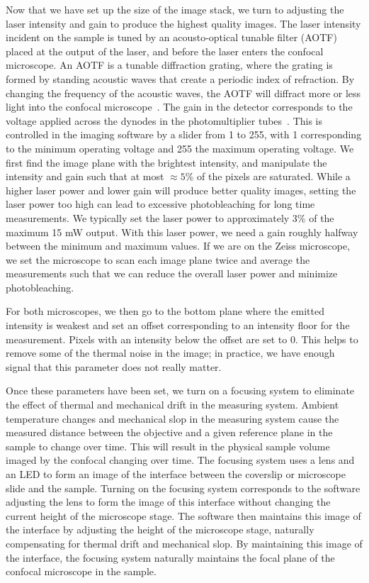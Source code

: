 Now that we have set up the size of the image stack, we turn to adjusting the laser intensity and gain to produce the highest quality images.
The laser intensity incident on the sample is tuned by an acousto-optical tunable filter (AOTF) placed at the output of the laser, and before the laser enters the confocal microscope.
An AOTF is a tunable diffraction grating, where the grating is formed by standing acoustic waves that create a periodic index of refraction.
By changing the frequency of the acoustic waves, the AOTF will diffract more or less light into the confocal microscope~\cite{RN317}.
The gain in the detector corresponds to the voltage applied across the dynodes in the photomultiplier tubes~\cite{RN316}.
This is controlled in the imaging software by a slider from 1 to 255, with 1 corresponding to the minimum operating voltage and 255 the maximum operating voltage.
We first find the image plane with the brightest intensity, and manipulate the intensity and gain such that at most $\approx 5$\% of the pixels are saturated.
While a higher laser power and lower gain will produce better quality images, setting the laser power too high can lead to excessive photobleaching for long time measurements.
We typically set the laser power to approximately 3\% of the maximum 15 mW output.
With this laser power, we need a gain roughly halfway between the minimum and maximum values.
If we are on the Zeiss microscope, we set the microscope to scan each image plane twice and average the measurements such that we can reduce the overall laser power and minimize photobleaching.

For both microscopes, we then go to the bottom plane where the emitted intensity is weakest and set an offset corresponding to an intensity floor for the measurement.
Pixels with an intensity below the offset are set to 0.
This helps to remove some of the thermal noise in the image; in practice, we have enough signal that this parameter does not really matter.

Once these parameters have been set, we turn on a focusing system to eliminate the effect of thermal and mechanical drift in the measuring system.
Ambient temperature changes and mechanical slop in the measuring system cause the measured distance between the objective and a given reference plane in the sample to change over time.
This will result in the physical sample volume imaged by the confocal changing over time.
The focusing system uses a lens and an LED to form an image of the interface between the coverslip or microscope slide and the sample.
Turning on the focusing system corresponds to the software adjusting the lens to form the image of this interface without changing the current height of the microscope stage.
The software then maintains this image of the interface by adjusting the height of the microscope stage, naturally compensating for thermal drift and mechanical slop.
By maintaining this image of the interface, the focusing system naturally maintains the focal plane of the confocal microscope in the sample.

